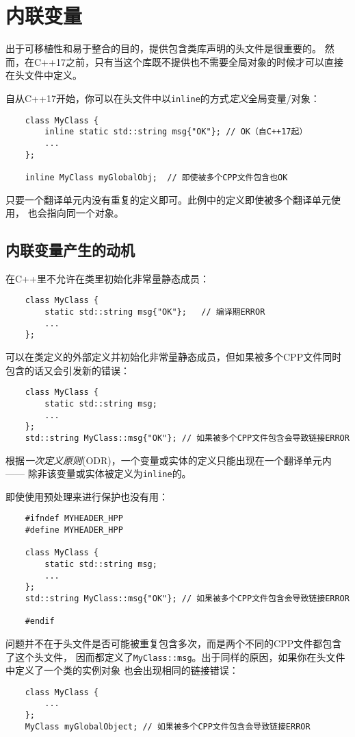 \chapter{内联变量}\label{ch3}
出于可移植性和易于整合的目的，提供包含类库声明的头文件是很重要的。
然而，在C++17之前，只有当这个库既不提供也不需要全局对象的时候才可以直接在头文件中定义。

自从C++17开始，你可以在头文件中以\texttt{inline}的方式\emph{定义}全局变量/对象：
\begin{lstlisting}
    class MyClass {
        inline static std::string msg{"OK"}; // OK（自C++17起）
        ...
    };

    inline MyClass myGlobalObj;  // 即使被多个CPP文件包含也OK
\end{lstlisting}
只要一个翻译单元内没有重复的定义即可。此例中的定义即使被多个翻译单元使用，
也会指向同一个对象。

\section{内联变量产生的动机}
在C++里不允许在类里初始化非常量静态成员：
\begin{lstlisting}
    class MyClass {
        static std::string msg{"OK"};   // 编译期ERROR
        ...
    };
\end{lstlisting}
可以在类定义的外部定义并初始化非常量静态成员，但如果被多个CPP文件同时包含的话又会引发新的错误：
\begin{lstlisting}
    class MyClass {
        static std::string msg;
        ...
    };
    std::string MyClass::msg{"OK"}; // 如果被多个CPP文件包含会导致链接ERROR
\end{lstlisting}
根据\emph{一次定义原则}(ODR)，一个变量或实体的定义只能出现在一个翻译单元内——
除非该变量或实体被定义为\texttt{inline}的。

即使使用预处理来进行保护也没有用：
\begin{lstlisting}
    #ifndef MYHEADER_HPP
    #define MYHEADER_HPP

    class MyClass {
        static std::string msg;
        ...
    };
    std::string MyClass::msg{"OK"}; // 如果被多个CPP文件包含会导致链接ERROR

    #endif
\end{lstlisting}
问题并不在于头文件是否可能被重复包含多次，而是两个不同的CPP文件都包含了这个头文件，
因而都定义了\texttt{MyClass::msg}。出于同样的原因，如果你在头文件中定义了一个类的实例对象
也会出现相同的链接错误：
\begin{lstlisting}
    class MyClass {
        ...
    };
    MyClass myGlobalObject; // 如果被多个CPP文件包含会导致链接ERROR
\end{lstlisting}

